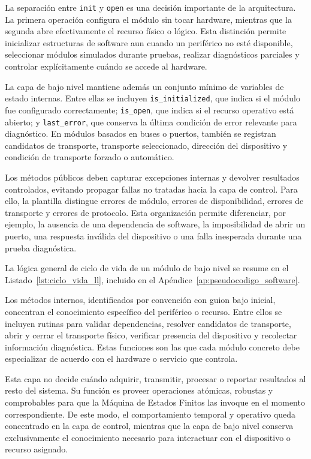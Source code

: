 La separación entre \texttt{init} y \texttt{open} es una decisión importante de la arquitectura. La primera operación configura el módulo sin tocar hardware, mientras que la segunda abre efectivamente el recurso físico o lógico. Esta distinción permite inicializar estructuras de software aun cuando un periférico no esté disponible, seleccionar módulos simulados durante pruebas, realizar diagnósticos parciales y controlar explícitamente cuándo se accede al hardware.

La capa de bajo nivel mantiene además un conjunto mínimo de variables de estado internas. Entre ellas se incluyen \texttt{is\_initialized}, que indica si el módulo fue configurado correctamente; \texttt{is\_open}, que indica si el recurso operativo está abierto; y \texttt{last\_error}, que conserva la última condición de error relevante para diagnóstico. En módulos basados en buses o puertos, también se registran candidatos de transporte, transporte seleccionado, dirección del dispositivo y condición de transporte forzado o automático.

Los métodos públicos deben capturar excepciones internas y devolver resultados controlados, evitando propagar fallas no tratadas hacia la capa de control. Para ello, la plantilla distingue errores de módulo, errores de disponibilidad, errores de transporte y errores de protocolo. Esta organización permite diferenciar, por ejemplo, la ausencia de una dependencia de software, la imposibilidad de abrir un puerto, una respuesta inválida del dispositivo o una falla inesperada durante una prueba diagnóstica.

La lógica general de ciclo de vida de un módulo de bajo nivel se resume en el Listado~\ref{lst:ciclo_vida_ll}, incluido en el Apéndice~\ref{ap:pseudocodigo_software}.

Los métodos internos, identificados por convención con guion bajo inicial, concentran el conocimiento específico del periférico o recurso. Entre ellos se incluyen rutinas para validar dependencias, resolver candidatos de transporte, abrir y cerrar el transporte físico, verificar presencia del dispositivo y recolectar información diagnóstica. Estas funciones son las que cada módulo concreto debe especializar de acuerdo con el hardware o servicio que controla.

Esta capa no decide cuándo adquirir, transmitir, procesar o reportar resultados al resto del sistema. Su función es proveer operaciones atómicas, robustas y comprobables para que la Máquina de Estados Finitos las invoque en el momento correspondiente. De este modo, el comportamiento temporal y operativo queda concentrado en la capa de control, mientras que la capa de bajo nivel conserva exclusivamente el conocimiento necesario para interactuar con el dispositivo o recurso asignado.

